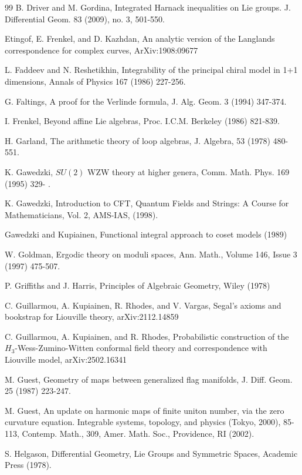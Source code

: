 \documentclass{amsart}
\theoremstyle{conjecture}
\theoremstyle{definition}
\theoremstyle{question}
\theoremstyle{questions}
\theoremstyle{remark}
\theoremstyle{remarks}
\theoremstyle{example}
\numberwithin{equation}{section}
\begin{document}
\begin{thebibliography}{99}
 B. Driver and M. Gordina, Integrated Harnack inequalities on Lie groups.
J. Differential Geom. 83 (2009), no. 3, 501-550.

 Etingof, E. Frenkel, and D. Kazhdan, An analytic version of the Langlands correspondence for complex curves, ArXiv:1908:09677

 L. Faddeev and N. Reshetikhin, Integrability of the principal chiral model
 in 1+1 dimensions, Annals of Physics 167 (1986) 227-256.

 G. Faltings, A proof for the Verlinde
formula, J.  Alg.  Geom.  3 (1994) 347-374.

I. Frenkel, Beyond affine Lie algebras,  Proc. I.C.M. Berkeley (1986) 821-839.

 H. Garland, The arithmetic theory of loop algebras, J. Algebra, 53 (1978) 480-551.

 K. Gawedzki, $SU(2)$ WZW theory at higher
genera, Comm.  Math.  Phys.  169 (1995) 329- .

 K. Gawedzki, Introduction to CFT, Quantum
Fields and Strings:  A Course for Mathematicians, Vol.
2, AMS-IAS, (1998).

 Gawedzki and Kupiainen, Functional integral approach to coset models  (1989)

 W. Goldman, Ergodic theory on moduli spaces, Ann. Math., Volume 146, Issue 3 (1997) 475-507.

 P. Griffiths and J. Harris, Principles of
Algebraic Geometry, Wiley (1978)

 C. Guillarmou, A. Kupiainen, R. Rhodes, and V. Vargas, Segal's axioms
and bookstrap for Liouville theory, arXiv:2112.14859

 C. Guillarmou, A. Kupiainen, and R. Rhodes, Probabilistic construction of the $H_3$-Wess-Zumino-Witten 
conformal field theory and correspondence with Liouville model, arXiv:2502.16341

 M. Guest, Geometry of maps between generalized flag manifolds,
J. Diff. Geom. 25 (1987) 223-247.

 M. Guest, An update on harmonic maps of finite uniton number, via the zero
curvature equation. Integrable systems, topology, and physics (Tokyo, 2000), 85-113,
Contemp. Math., 309, Amer. Math. Soc., Providence, RI (2002).

 S. Helgason, Differential Geometry, Lie Groups and Symmetric Spaces, Academic Press
(1978).


\end{thebibliography}
\end{document}

